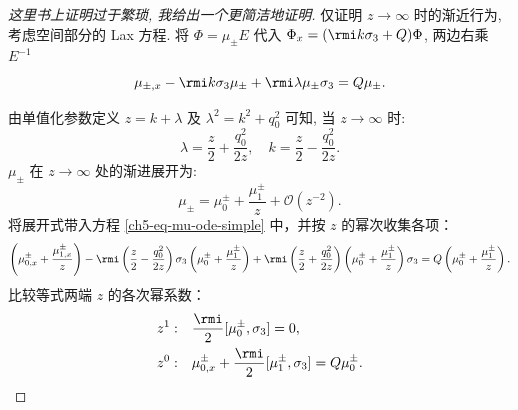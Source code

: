 \begin{proof}[这里书上证明过于繁琐, 我给出一个更简洁地证明]
    仅证明 $z \to \infty$ 时的渐近行为, 考虑空间部分的 Lax 方程. 将 $\Phi = \mu_{\pm} E$ 代入 $\Phi_{x} = (\rmi k \sigma_{3} + Q)\Phi$, 两边右乘 $E^{-1}$
    \begin{equation}
        \mu_{\pm, x} - \rmi k \sigma_{3} \mu_{\pm} + \rmi \lambda \mu_{\pm} \sigma_{3} = Q \mu_{\pm}.
        \label{ch5-eq-mu-ode-simple}
    \end{equation}

    由单值化参数定义 $z = k + \lambda$ 及 $\lambda^2 = k^2 + q_0^2$ 可知, 当 $z \to \infty$ 时:
    \begin{equation}
        \lambda = \frac{z}{2} + \frac{q_0^2}{2z}, \quad k = \frac{z}{2} - \frac{q_0^2}{2z}.
    \end{equation}
    $\mu_{\pm}$ 在 $z \to \infty$ 处的渐进展开为:
    \begin{equation}
        \mu_{\pm} = \mu_{0}^{\pm} + \frac{\mu_{1}^{\pm}}{z} + \mathcal{O}(z^{-2}).
        \label{ch5-eq-mu-exp}
    \end{equation}
    将展开式带入方程 \eqref{ch5-eq-mu-ode-simple} 中，并按 $z$ 的幂次收集各项：
    \begin{equation}
        \left( \mu_{0,x}^{\pm} + \frac{\mu_{1,x}^{\pm}}{z} \right) - \rmi \left( \frac{z}{2} - \frac{q_0^2}{2z} \right) \sigma_{3} \left( \mu_{0}^{\pm} + \frac{\mu_{1}^{\pm}}{z} \right) + \rmi \left( \frac{z}{2} + \frac{q_0^2}{2z} \right) \left( \mu_{0}^{\pm} + \frac{\mu_{1}^{\pm}}{z} \right) \sigma_{3} = Q \left( \mu_{0}^{\pm} + \frac{\mu_{1}^{\pm}}{z} \right).
    \end{equation}
    比较等式两端 $z$ 的各次幂系数：
    \begin{align}
        z^{1} : & \quad \frac{\rmi}{2} [\mu_{0}^{\pm}, \sigma_{3}] = 0, \label{ch5-eq-exp-z1}                                 \\
        z^{0} : & \quad \mu_{0,x}^{\pm} + \frac{\rmi}{2} [\mu_{1}^{\pm}, \sigma_{3}] = Q \mu_{0}^{\pm}. \label{ch5-eq-exp-z0}
    \end{align}


\end{proof}

